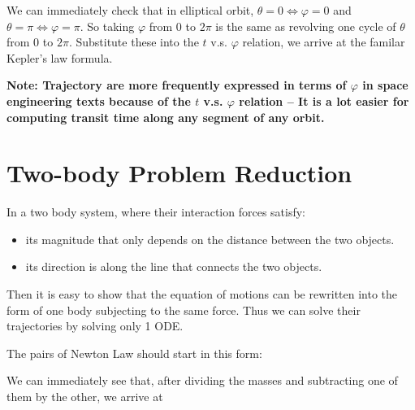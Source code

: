 \documentclass[class=article, crop=false, 12pt]{standalone}
\begin{document}
We can immediately check that in elliptical orbit, 
$\theta = 0 \Leftrightarrow \varphi = 0$ and $\theta=\pi \Leftrightarrow \varphi=\pi$. 
So taking $\varphi$ from $0$ to $2\pi$ is the same as revolving one cycle of $\theta$ from $0$ to $2\pi$. 
Substitute these into the $t$ v.s. $\varphi$ relation, we arrive at the familar Kepler's  law formula.

\bf{Note:} Trajectory are more frequently expressed in terms of $\varphi$ in space engineering texts because of the $t$ v.s. $\varphi$ relation --
It is a lot easier for computing transit time along any segment of any orbit.







\linesep
\section{Two-body Problem Reduction}

In a two body system, where their interaction forces satisfy:
\begin{itemize}
    \item its magnitude that only depends on the distance between the two objects.
    \item its direction is along the line that connects the two objects.
\end{itemize} 
Then it is easy to show that the equation of motions can be rewritten into the form of one body subjecting to the same force. 
Thus we can solve their trajectories by solving only 1 ODE.


The pairs of Newton  Law should start in this form:

We can immediately see that, after dividing the masses and subtracting one of them by the other, we arrive at
\end{document}
